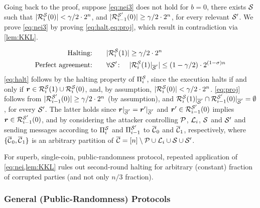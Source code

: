 Going back to the proof, suppose \cref{eq:nei3} does not hold for $b=0$,  \ie there exists $\mathcal{S}$ such that $|\mathcal{R}_{i}^{\mathcal{S}}(0)|< \gamma/2 \cdot 2^{n}$, and $|\mathcal{R}_{i-1}^{\mathcal{S}'}(0)|\ge \gamma/2 \cdot 2^n$, for every relevant $\mathcal{S}'$.  We prove \cref{eq:nei3} by proving \cref{eq:halt,eq:proj}, which result in contradiction via \cref{lem:KKL}.

\begin{align}
\text{Halting:}&\qquad  |\mathcal{R}_{i }^{\mathcal{S}}(1)|\ge \gamma/2 \cdot 2^{n}  \label{eq:halt} \\
\text{Perfect agreement:}&\qquad   \forall \mathcal{S}' \colon \quad |\mathcal{R}_{i}^{\mathcal{S}}(1)|_{\overline{\mathcal{S}}'}|\le (1-\gamma/2)\cdot 2^{(1-\sigma) n}   \label{eq:proj}
\end{align}
\noindent
{}
\cref{eq:halt} follows by the halting property of $\Pi_{i}^{\mathcal{S}}$, since the execution halts if and only if ${ \boldsymbol{r}}\in \mathcal{R}_{i }^{\mathcal{S}}(1)\cup \mathcal{R}_{i }^{\mathcal{S}}(0)$, and, by assumption, $|\mathcal{R}_{i }^{\mathcal{S}}(0)|< \gamma/2 \cdot 2^{n}$. \cref{eq:proj} follows from $|\mathcal{R}_{i-1}^{\mathcal{S}'}(0)|\ge \gamma/2 \cdot 2^{n}$ (by assumption), and $\mathcal{R}_{i }^{\mathcal{S}}(1)|_{\overline{\mathcal{S}}'} \cap \mathcal{R}_{i-1}^{\mathcal{S}'}(0)|_{\overline{ \mathcal{S}}'}=\emptyset$, for every $\mathcal{S}'$. The latter holds since ${ \boldsymbol{r}}|_{\overline{\mathcal{S}}'}={ \boldsymbol{r}}'|_{\overline{\mathcal{S}}'}$ and ${ \boldsymbol{r}}'\in \mathcal{R}_{i-1}^{\mathcal{S}'}(0)$ implies ${ \boldsymbol{r}}\in \mathcal{R}_{i-1}^{\mathcal{S}'}(0)$, and by considering the attacker controlling $\mathcal{P}$, ${\cal{L}}_{i}$, $\mathcal{S}$ and $\mathcal{S}'$ and sending messages according to $\Pi_{i
}^{\mathcal{S}}$ and $\Pi_{i-1}^{\mathcal{S}'}$ to $\overline{\mathcal{C}}_0$ and $\overline{\mathcal{C}}_1$, respectively, where $\{\overline{\mathcal{C}}_0,\overline{\mathcal{C}}_1\}$ is an arbitrary partition of $\overline{\mathcal{C}}=[n]\setminus \mathcal{P}\cup {\cal{L}}_{i} \cup \mathcal{S}\cup \mathcal{S}'$.






\begin{remark}
For superb, single-coin, public-randomness protocol, repeated application of \cref{eq:nei,lem:KKL} rules out  second-round halting for arbitrary (constant) fraction of corrupted parties  (and not only  $n/3$ fraction).
\end{remark}


\ifdefined\IsFullVersion\else
\vspace{-.3cm}
\fi
\ifdefined\IsFullVersion
\subsubsection{General (Public-Randomness) Protocols}\label{sec:technique:3:2}
\else
